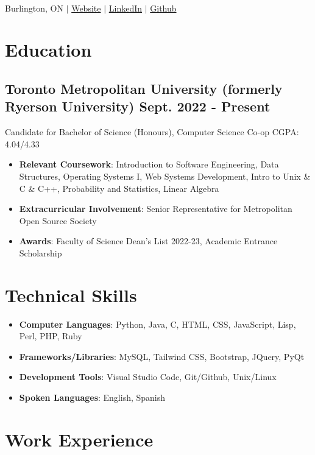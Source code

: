 \documentclass[10pt]{article}
\author{Nicholas Caro Lopez}
\date{May 2023}
\newcommand{\rightindent}[1]{\hfill{\textmd{#1}}}
\renewcommand{\maketitle}{
    \begin{center}
    {\LARGE\bfseries\theauthor\\} %
    \vspace{0.3em} %
    Burlington, ON $\mid$ \href{https://nickcarolopez.ca/}{Website}  $\mid$ \href{https://linkedin.com/in/nicholas-caro-lopez-123738252/}{LinkedIn} $\mid$ \href{https://github.com/nicholas489}{Github}
    \end{center}
    \vspace{-1.2em} %
}
\begin{document}
\maketitle

\section{Education}
\subsection{Toronto Metropolitan University (formerly Ryerson University) \rightindent{Sept. 2022 - Present}}
\vspace{-0.3em}Candidate for Bachelor of Science (Honours), Computer Science Co-op \rightindent{CGPA: 4.04/4.33}
\begin{itemize}
    \item \textbf{Relevant Coursework}: Introduction to Software Engineering, Data Structures, Operating Systems I, Web Systems Development, Intro to Unix \& C \& C++, Probability and Statistics, Linear Algebra
    \item \textbf{Extracurricular Involvement}: Senior Representative for Metropolitan Open Source Society
    \item \textbf{Awards}: Faculty of Science Dean's List 2022-23, Academic Entrance Scholarship 
\end{itemize}

\section{Technical Skills}
\begin{itemize}
    \item \textbf{Computer Languages}: Python, Java, C, HTML, CSS, JavaScript, Lisp, Perl, PHP, Ruby
    \item \textbf{Frameworks/Libraries}: MySQL, Tailwind CSS, Bootstrap, JQuery, PyQt
    \item \textbf{Development Tools}: Visual Studio Code, Git/Github, Unix/Linux
    \item \textbf{Spoken Languages}: English, Spanish
\end{itemize}

\section{Work Experience}
\end{document}
